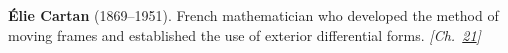 \textbf{Élie Cartan} (1869–1951). French mathematician who developed the method of moving frames and established the use of exterior differential forms. \emph{[Ch.~\hyperref[ch:exponentialmapslietheory]{21}]}

